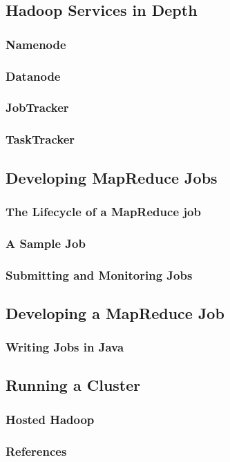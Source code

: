 \documentclass{beamer}
\begin{document}
\subsection{Hadoop Services in Depth}

\frame 
{
  \frametitle{Namenode}
}

\frame 
{
  \frametitle{Datanode}
}

\frame 
{
  \frametitle{JobTracker}
}

\frame 
{
  \frametitle{TaskTracker}
}

\subsection{Developing MapReduce Jobs}

\frame
{
  \frametitle{The Lifecycle of a MapReduce job}

}

\frame
{
  \frametitle{A Sample Job}

}

\frame
{
  \frametitle{Submitting and Monitoring Jobs}
}


\subsection{Developing a MapReduce Job}

\frame
{
  \frametitle{Writing Jobs in Java}
}


\subsection{Running a Cluster}

\frame 
{
  \frametitle{Hosted Hadoop}
}


\frame
{
  \frametitle{References}
  \printbibliography
}
\end{document}
